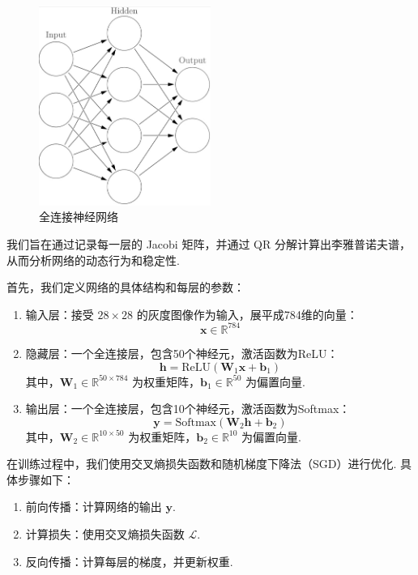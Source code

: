\begin{figure}[htbp]
   \centering
   \includegraphics[width=0.5\textwidth]{figures/nn.jpeg}
   \caption{全连接神经网络}
   \label{fig:example}
 \end{figure}

我们旨在通过记录每一层的 Jacobi 矩阵，并通过 QR 分解计算出李雅普诺夫谱，从而分析网络的动态行为和稳定性. 

首先，我们定义网络的具体结构和每层的参数：

\begin{enumerate}
   \item 输入层：接受 $28\times28$ 的灰度图像作为输入，展平成784维的向量：
   \[
   \mathbf{x} \in \mathbb{R}^{784}
   \]

\item 隐藏层：一个全连接层，包含50个神经元，激活函数为ReLU：
   \[
   \mathbf{h} = \text{ReLU}(\mathbf{W}_1 \mathbf{x} + \mathbf{b}_1)
   \]
   其中，\(\mathbf{W}_1 \in \mathbb{R}^{50 \times 784}\) 为权重矩阵，\(\mathbf{b}_1 \in \mathbb{R}^{50}\) 为偏置向量. 

\item 输出层：一个全连接层，包含10个神经元，激活函数为Softmax：
   \[
   \mathbf{y} = \text{Softmax}(\mathbf{W}_2 \mathbf{h} + \mathbf{b}_2)
   \]
   其中，\(\mathbf{W}_2 \in \mathbb{R}^{10 \times 50}\) 为权重矩阵，\(\mathbf{b}_2 \in \mathbb{R}^{10}\) 为偏置向量. 
\end{enumerate}

在训练过程中，我们使用交叉熵损失函数和随机梯度下降法（SGD）进行优化. 具体步骤如下：

\begin{enumerate}
   \item 前向传播：计算网络的输出 \(\mathbf{y}\). 
   \item 计算损失：使用交叉熵损失函数 \(\mathcal{L}\). 
   \item 反向传播：计算每层的梯度，并更新权重. 
\end{enumerate}

